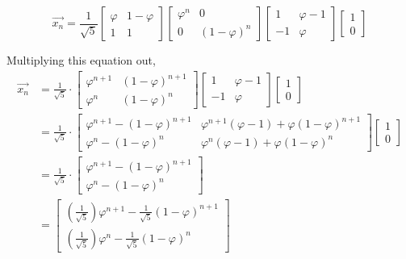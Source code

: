 \documentclass{article}
\begin{document}
\begin{equation*}
     \vec{x_n} = \frac{1}{\sqrt{5}}
     \begin{bmatrix}
        \varphi & 1-\varphi \\
        1 & 1
    \end{bmatrix}
    \begin{bmatrix}
        \varphi^n & 0 \\
        0 & (1-\varphi)^n
    \end{bmatrix}
    \begin{bmatrix}
    1 & \varphi-1\\
    -1 & \varphi
    \end{bmatrix}
    \begin{bmatrix}
    1\\0
    \end{bmatrix} 
    \end{equation*}
    
Multiplying this equation out,
    \begin{align*}
        \vec{x_n} &= \frac{1}{\sqrt{5}} \cdot \begin{bmatrix}
        \varphi^{n+1} & (1-\varphi)^{n+1} \\
        \varphi^n & (1-\varphi)^n
    \end{bmatrix} \begin{bmatrix}
    1 & \varphi-1\\
    -1 & \varphi
    \end{bmatrix} \begin{bmatrix}
    1\\0
    \end{bmatrix} \\
    &= \frac{1}{\sqrt{5}} \cdot \begin{bmatrix}
    \varphi^{n+1} - (1-\varphi)^{n+1} & \varphi^{n+1}(\varphi-1) + \varphi(1-\varphi)^{n+1} \\
    \varphi^n - (1-\varphi)^n & \varphi^n(\varphi -1) +\varphi(1-\varphi)^n
    \end{bmatrix} \begin{bmatrix}
    1\\0
    \end{bmatrix} \\
    &= \frac{1}{\sqrt{5}} \cdot \begin{bmatrix}
     \varphi^{n+1} - (1-\varphi)^{n+1} \\
      \varphi^n - (1-\varphi)^n
    \end{bmatrix} \\
    &=  \begin{bmatrix}
     (\frac{1}{\sqrt{5}})\varphi^{n+1} - \frac{1}{\sqrt{5}}(1-\varphi)^{n+1} \\
      (\frac{1}{\sqrt{5}})\varphi^n - \frac{1}{\sqrt{5}}(1-\varphi)^n
    \end{bmatrix}
\end{align*}
\end{document}
